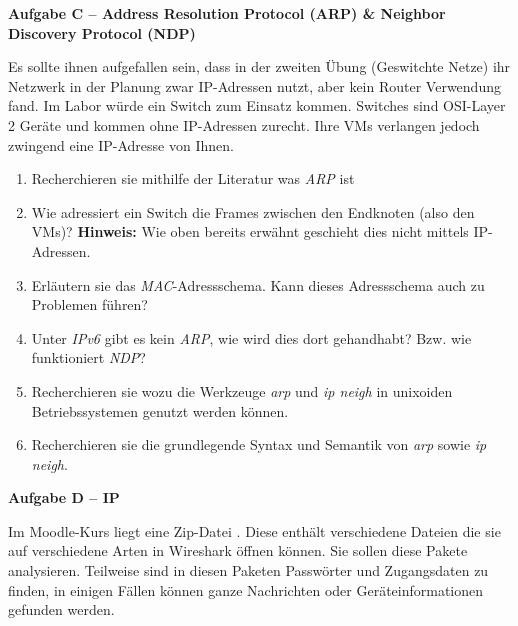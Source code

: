 \documentclass[paper=a4,fontsize=11pt]{scrartcl}%
\numberwithin{equation}{section}
\begin{document}
\begin{center}\Large{\textbf{Aufgabe C -- Address Resolution Protocol (ARP) \& Neighbor Discovery Protocol (NDP)}}\end{center}\vskip0.25in
Es sollte ihnen aufgefallen sein, dass in der zweiten Übung (Geswitchte Netze) ihr Netzwerk in der Planung zwar IP-Adressen nutzt, aber kein Router Verwendung fand. Im Labor würde ein Switch zum Einsatz kommen. Switches sind OSI-Layer 2 Geräte und kommen ohne IP-Adressen zurecht. Ihre VMs verlangen jedoch zwingend eine IP-Adresse von Ihnen.
\begin{enumerate}
		\item Recherchieren sie mithilfe der Literatur was \emph{ARP} ist \cite[Kap. 5.4f]{Kurose2012}
		\item Wie adressiert ein Switch die Frames zwischen den Endknoten (also den VMs)? \textbf{Hinweis:} Wie oben bereits erwähnt geschieht dies nicht mittels IP-Adressen.
		\item Erläutern sie das \emph{MAC}-Adressschema. Kann dieses Adressschema auch zu Problemen führen?
		\item Unter \emph{IPv6} gibt es kein \emph{ARP}, wie wird dies dort gehandhabt? Bzw. wie funktioniert \emph{NDP}?
		\item Recherchieren sie wozu die Werkzeuge \emph{arp} und \emph{ip neigh} in unixoiden Betriebssystemen genutzt werden können.
		\item Recherchieren sie die grundlegende Syntax und Semantik von \emph{arp} sowie \emph{ip neigh}.
\end{enumerate}


\begin{center}\Large{\textbf{Aufgabe D -- IP}}\end{center}\vskip0.2in
Im Moodle-Kurs liegt eine Zip-Datei . Diese enthält verschiedene Dateien die sie auf verschiedene Arten in Wireshark öffnen können. Sie sollen diese Pakete analysieren. Teilweise sind in diesen Paketen Passwörter und Zugangsdaten zu finden, in einigen Fällen können ganze Nachrichten oder Geräteinformationen gefunden werden.
\end{document}
